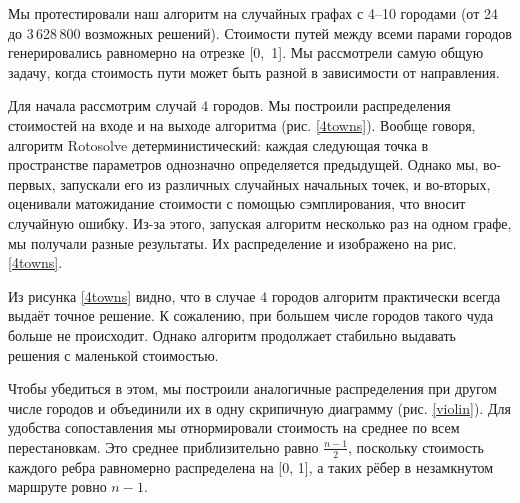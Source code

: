 




Мы протестировали наш алгоритм на случайных графах с 4--10 городами (от 24 до 3\,628\,800 возможных решений). 
Стоимости путей между всеми парами городов генерировались равномерно на отрезке [0,~1]. 
Мы рассмотрели самую общую задачу, когда стоимость пути может быть разной в зависимости от направления.


Для начала рассмотрим случай 4 городов. Мы построили распределения стоимостей на входе и на выходе алгоритма (рис. \ref{4towns}). 
Вообще говоря, алгоритм Rotosolve детерминистический: каждая следующая точка в пространстве параметров однозначно определяется предыдущей. Однако мы, во-первых, запускали его из различных случайных начальных точек, и во-вторых, оценивали матожидание стоимости с помощью сэмплирования, что вносит случайную ошибку. Из-за этого, запуская алгоритм несколько раз на одном графе, мы получали разные результаты. Их распределение и изображено на рис. \ref{4towns}.


Из рисунка \ref{4towns} видно, что в случае 4 городов алгоритм практически всегда выдаёт точное решение. К сожалению, при большем числе городов такого чуда больше не происходит. Однако алгоритм продолжает стабильно выдавать решения с маленькой стоимостью.

Чтобы убедиться в этом, мы построили аналогичные распределения 
при другом числе городов и объединили их в одну скрипичную диаграмму (рис. \ref{violin}). Для удобства сопоставления мы отнормировали стоимость на среднее по всем перестановкам. Это среднее приблизительно равно $\frac{n-1}{2}$, поскольку стоимость каждого ребра равномерно распределена на [0, 1], а таких рёбер в незамкнутом маршруте ровно $n-1$.

